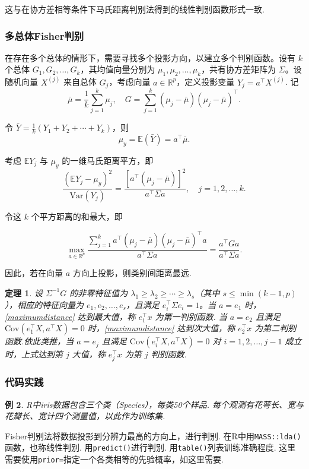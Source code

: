 \documentclass[12pt, a4paper, oneside]{ctexart}
\newtheorem{theorem}{定理}[section]
\newtheorem{example}[theorem]{例}
\begin{document}
	这与在协方差相等条件下马氏距离判别法得到的线性判别函数形式一致.
	\subsubsection{多总体Fisher判别}
	
	在存在多个总体的情形下，需要寻找多个投影方向，以建立多个判别函数。设有 \(k\) 个总体 \(G_1, G_2, \ldots, G_k\)，其均值向量分别为 \(\mu_1, \mu_2, \ldots, \mu_k\)，共有协方差矩阵为 \(\Sigma\)。设随机向量 \(X^{(j)}\) 来自总体 \(G_j\)，考虑向量 \(a \in \mathbb{R}^p\)，定义投影变量 \(Y_j = a^\top X^{(j)}\). 记
	\[
	\bar{\mu} = \frac{1}{k} \sum_{j=1}^{k} \mu_j, \quad G = \sum_{j=1}^{k} (\mu_j - \bar{\mu})(\mu_j - \bar{\mu})^\top.
	\]
	
	令 \(\bar{Y} = \frac{1}{k}(Y_1 + Y_2 + \cdots + Y_k)\)，则
	\[
	\mu_y = \mathbb{E}(\bar{Y}) = a^\top \bar{\mu}.
	\]
	
	考虑 \(\mathbb{E}Y_j\) 与 \(\mu_y\) 的一维马氏距离平方，即
	\[
	\frac{(\mathbb{E}Y_j - \mu_y)^2}{\mathrm{Var}(Y_j)} = \frac{[a^\top(\mu_j - \bar{\mu})]^2}{a^\top \Sigma a}, \quad j = 1, 2, \ldots, k.
	\]
	
	令这 \(k\) 个平方距离的和最大，即
	
	\begin{equation}
		\max_{a \in \mathbb{R}^p} \frac{\sum_{j=1}^{k} a^\top(\mu_j - \bar{\mu})(\mu_j - \bar{\mu})^\top a}{a^\top \Sigma a} = \frac{a^\top G a}{a^\top \Sigma a}. \label{maximumdistance}
	\end{equation}
	
	
	因此，若在向量 \(a\) 方向上投影，则类别间距离最远.
	
	\begin{theorem}
		设 \(\Sigma^{-1} G\) 的非零特征值为 \(\lambda_1 \geq \lambda_2 \geq \cdots \geq \lambda_s\)（其中 \(s \leq \min(k-1, p)\)），相应的特征向量为 \(e_1, e_2, \ldots, e_s\)，且满足 \(e_i^\top \Sigma e_i = 1\)。当 \(a = e_1\) 时，\eqref{maximumdistance} 达到最大值，称 \(e_1^\top x\) 为第一判别函数. 当 \(a = e_2\) 且满足 \(\mathrm{Cov}(e_1^\top X, a^\top X) = 0\) 时，\eqref{maximumdistance} 达到次大值，称 \(e_2^\top x\) 为第二判别函数.依此类推，当 \(a = e_j\) 且满足 \(\mathrm{Cov}(e_i^\top X, a^\top X) = 0\) 对 \(i = 1, 2, \ldots, j-1\) 成立时，上式达到第 \(j\) 大值，称 \(e_j^\top x\) 为第 \(j\) 判别函数.
	\end{theorem}
	
	\subsubsection{代码实践}
	\begin{example}
		R中iris数据包含三个类（Species），每类50个样品. 每个观测有花萼长、宽与花瓣长、宽计四个测量值，以此作为训练集.		
	\end{example}
	Fisher判别法将数据投影到分辨力最高的方向上，进行判别. 在R中用\texttt{MASS::lda()}函数，也称线性判别. 用\texttt{predict()}进行判别. 用\texttt{table()}列表训练准确程度. 
	这里需要使用\texttt{prior=}指定一个各类相等的先验概率，如这里需要.
	
\end{document}
